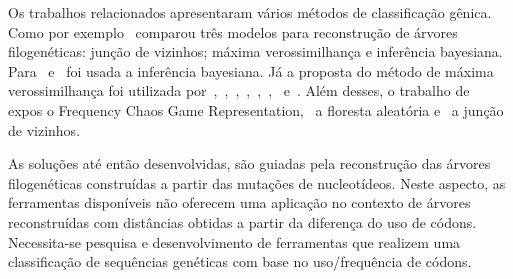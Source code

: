 Os trabalhos relacionados apresentaram vários métodos de classificação gênica. Como por exemplo~\cite{dimitrov_updated_2019} comparou três modelos para reconstrução de árvores filogenéticas: junção de vizinhos; máxima verossimilhança e inferência bayesiana. Para~\cite{yin_systematic_2019} e~\cite{bedoya-pilozo_molecular_epidemiology_2018} foi usada a inferência bayesiana. Já a proposta do método de máxima verossimilhança foi utilizada por~\cite{fall_genetic_diversity_2021},~\cite{behl_threat_2022},~\cite{shabbir_comprehensive_2020},~\cite{hudu_hepatitis_2018},~\cite{sallard_tracing_2021},~\cite{paez-espino_diversity_evolution_2019},~\cite{tang_evolutionary_2021} e~\cite{cho_analysis_2022}. Além desses, o trabalho de~\cite{lichtblau_alignment-free_2019} expos o Frequency Chaos Game Representation,~\cite{kim_ngs_2022} a floresta aleatória e~\cite{potdar_phylogenetic_2021} a junção de vizinhos.

As soluções até então desenvolvidas, são guiadas pela reconstrução das árvores filogenéticas construídas a partir das mutações de nucleotídeos. Neste aspecto, as ferramentas disponíveis não oferecem uma aplicação no contexto de árvores reconstruídas com distâncias obtidas a partir da diferença do uso de códons. Necessita-se pesquisa e desenvolvimento de ferramentas que realizem uma classificação de sequências genéticas com base no uso/frequência de códons.





